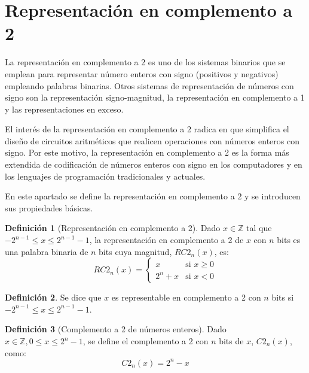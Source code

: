 \documentclass[spanish,a4paper,12pt,titlepage]{article}
\theoremstyle{definition}
\newtheorem{definition}{Definición}%
\theoremstyle{remark}
\newcommand{\bbZ}{\mathbb{Z}}
\begin{document}
\section{Representación en complemento a 2}

La representación en complemento a 2 es uno de los sistemas binarios que se emplean para representar número enteros con signo (positivos y negativos) empleando palabras binarias. Otros sistemas de representación de números con signo son la representación signo-magnitud, la representación en complemento a 1 y las representaciones en exceso.

El interés de la representación en complemento a 2 radica en que simplifica el diseño de circuitos aritméticos que realicen operaciones con números enteros con signo. Por este motivo, la representación en complemento a 2 es la forma más extendida de codificación de números enteros con signo en los computadores y en los lenguajes de programación tradicionales y actuales.

En este apartado se define la representación en complemento a 2 y se introducen sus propiedades básicas.

\begin{definition}[Representación en complemento a 2]\label{def-rep-ca2}
  Dado $x \in \bbZ$ tal que $-2^{n-1} \le x \le 2^{n-1}-1$, la representación en complemento a 2 de $x$ con $n$ bits es una palabra binaria de $n$ bits cuya magnitud, $RC2_n(x)$, es:
  \[
    RC2_n(x) =
      \begin{cases}
        x     & \text{si } x \ge 0\\
        2^n+x & \text{si } x < 0
      \end{cases}
  \]
\end{definition}

\begin{definition}\label{def-rep-ca2_rep}
  Se dice que $x$ es representable en complemento a 2 con $n$ bits si $-2^{n-1} \le x \le 2^{n-1}-1$.
\end{definition}

\begin{definition}[Complemento a 2 de números enteros]
  Dado $x \in \bbZ, 0 \le x \le 2^n-1$, se define el complemento a 2 con $n$ bits de $x$, $C2_n(x)$, como:
  \[
    C2_n(x) = 2^n - x
  \]
\end{definition}
\end{document}
